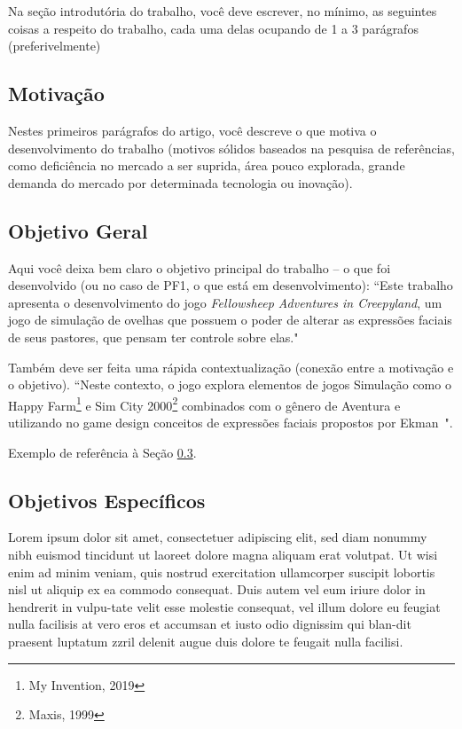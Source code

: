 Na seção introdutória do trabalho, você deve escrever, no mínimo, as seguintes coisas a respeito do trabalho, cada uma delas ocupando de 1 a 3 parágrafos (preferivelmente) 

\subsection{Motivação}
\label{secao:motivacao}
Nestes primeiros parágrafos do artigo, você descreve o que motiva o desenvolvimento do trabalho (motivos sólidos baseados na pesquisa de referências, como deficiência no mercado a ser suprida, área pouco explorada, grande demanda do mercado por determinada tecnologia ou inovação)\cite{notes2002}.  \cite{AIGAMEDEV}

\subsection{Objetivo Geral}
\label{secao:objetivo_geral}
Aqui você deixa bem claro o objetivo principal do trabalho -- o que foi desenvolvido (ou no caso de PF1, o que está em desenvolvimento): ``Este trabalho apresenta o desenvolvimento do jogo \emph{Fellowsheep Adventures in Creepyland}, um jogo de simulação de ovelhas que possuem o poder de alterar as expressões faciais de seus pastores, que pensam ter controle sobre elas." 

Também deve ser feita uma rápida contextualização (conexão entre a motivação e o objetivo). ``Neste contexto, o jogo explora elementos de jogos Simulação como o Happy Farm\footnote{My Invention, 2019} e Sim City 2000\footnote{Maxis, 1999} combinados com o gênero de Aventura e utilizando no game design conceitos de expressões faciais propostos por Ekman~\cite{Ekman:1978}".

Exemplo de referência à Seção \ref{secao:objetivos_especificos}.

\subsection{Objetivos Específicos}
\label{secao:objetivos_especificos}
Lorem ipsum dolor sit amet, consectetuer adipiscing elit, sed diam nonummy nibh euismod tincidunt ut laoreet dolore magna aliquam erat volutpat. Ut wisi enim ad minim veniam, quis nostrud exercitation ullamcorper suscipit lobortis nisl ut aliquip ex ea commodo consequat. Duis autem vel eum iriure dolor in hendrerit in vulpu-tate velit esse molestie consequat, vel illum dolore eu feugiat nulla facilisis at vero eros et accumsan et iusto odio dignissim qui blan-dit praesent luptatum zzril delenit augue duis dolore te feugait nulla facilisi.

